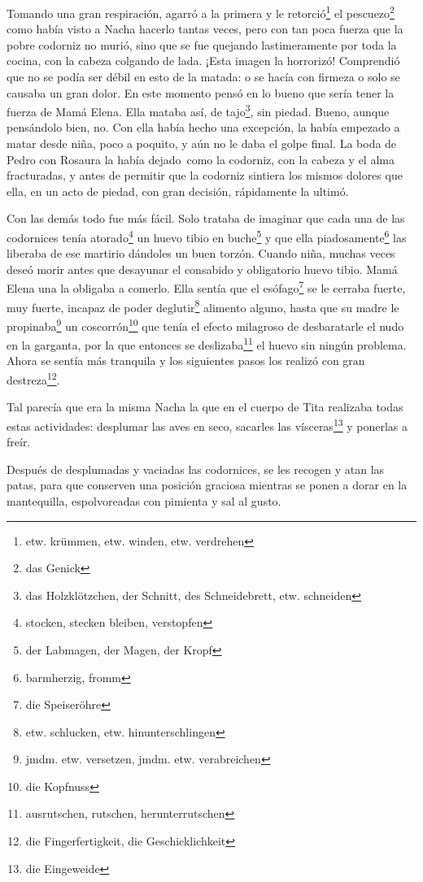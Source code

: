 Tomando una gran respiración, agarró a la primera y le retorció\footnote{etw. krümmen, etw. winden, etw. verdrehen} el pescuezo\footnote{das Genick} como había visto a Nacha hacerlo
tantas veces, pero con tan poca fuerza que la pobre codorniz no murió,
sino que se fue quejando lastimeramente por toda la cocina, con la cabeza
colgando de lada. ¡Esta imagen la horrorizó! Comprendió que no se podía
ser débil en esto de la matada: o se hacía con firmeza o solo se causaba
un gran dolor. En este momento pensó en lo bueno que sería tener la
fuerza de Mamá Elena. Ella mataba así, de tajo\footnote{das Holzklötzchen, der Schnitt, des Schneidebrett, etw. schneiden},
sin piedad. Bueno, aunque pensándolo bien, no. Con ella había hecho
una excepción, la había empezado a matar desde niña, poco a poquito,
y aún no le daba el golpe final. La boda de Pedro con Rosaura la había
dejado~como la codorniz, con la cabeza y el alma fracturadas, y
antes de permitir que la codorniz sintiera los mismos dolores que ella,
en un acto de piedad, con gran decisión, rápidamente la ultimó.

Con las demás todo fue más fácil. Solo trataba de imaginar que cada una
de las codornices tenía atorado\footnote{stocken, stecken bleiben, verstopfen}
un huevo tibio en buche\footnote{der Labmagen, der Magen, der Kropf}
y que ella piadosamente\footnote{barmherzig, fromm} las liberaba
de ese martirio dándoles un buen torzón.
Cuando niña, muchas veces deseó morir antes que desayunar el
consabido y
obligatorio huevo tibio. Mamá Elena una la obligaba a comerlo. Ella
sentía que el esófago\footnote{die Speiseröhre} se le
cerraba fuerte, muy fuerte, incapaz de poder deglutir\footnote{etw. schlucken, etw. hinunterschlingen}
alimento alguno, hasta que su madre le propinaba\footnote{jmdm. etw. versetzen, jmdm. etw. verabreichen}
un coscorrón\footnote{die Kopfnuss} que tenía el efecto milagroso
de desbaratarle el nudo en la
garganta, por la que entonces se deslizaba\footnote{ausrutschen, rutschen, herunterrutschen}
el huevo sin ningún problema. Ahora se sentía más tranquila y los siguientes
pasos los realizó con gran destreza\footnote{die Fingerfertigkeit, die Geschicklichkeit}.

Tal parecía que era la misma Nacha la que en el cuerpo de Tita realizaba
todas estas actividades: desplumar las aves en seco, sacarles las vísceras\footnote{die Eingeweide} y ponerlas a freír.

Después de desplumadas y vaciadas las codornices, se les recogen y atan
las patas, para que conserven una posición graciosa mientras se ponen a
dorar en la mantequilla, espolvoreadas con pimienta y sal al gusto.

